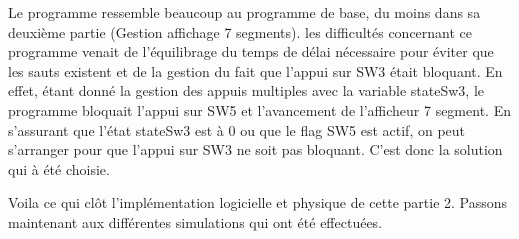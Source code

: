 Le programme ressemble beaucoup au programme de base, du moins dans sa deuxième partie (Gestion affichage 7 segments). les difficultés concernant ce programme venait de l'équilibrage du temps de délai nécessaire pour éviter que les sauts existent et de la gestion du fait que l'appui sur SW3 était bloquant. En effet, étant donné la gestion des appuis multiples avec la variable stateSw3, le programme bloquait l'appui sur SW5 et l'avancement de l'afficheur 7 segment. En s'assurant que l'état stateSw3 est à 0 ou que le flag SW5 est actif, on peut s'arranger pour que l'appui sur SW3 ne soit pas bloquant. C'est donc la solution qui à été choisie.\\\par
Voila ce qui clôt l'implémentation logicielle et physique de cette partie 2. Passons maintenant aux différentes simulations qui ont été effectuées.